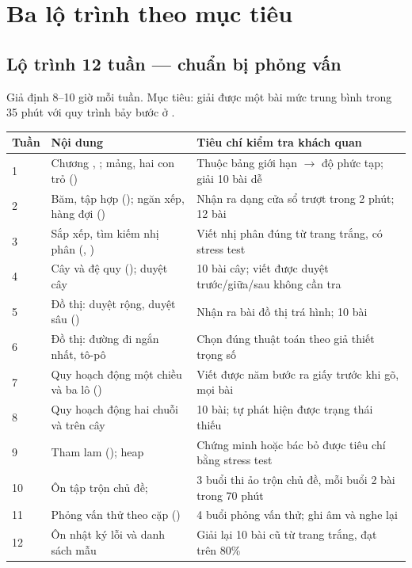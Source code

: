 \documentclass[../../algorithm.tex]{subfiles}
\begin{document}
\section{Ba lộ trình theo mục tiêu}

\subsection{Lộ trình 12 tuần --- chuẩn bị phỏng vấn}

Giả định 8--10 giờ mỗi tuần. Mục tiêu: giải được một bài mức trung bình trong 35 phút với quy trình bảy bước ở .

\begin{center}\footnotesize
\begin{tabularx}{\linewidth}{@{}L{1.9cm}L{4.6cm}Y@{}}
\toprule
\textbf{Tuần} & \textbf{Nội dung} & \textbf{Tiêu chí kiểm tra khách quan}\\
 & Chương , ; mảng, hai con trỏ () & Thuộc bảng giới hạn \(\rightarrow\) độ phức tạp; giải 10 bài dễ\\
2 & Băm, tập hợp (); ngăn xếp, hàng đợi () & Nhận ra dạng cửa sổ trượt trong 2 phút; 12 bài\\
3 & Sắp xếp, tìm kiếm nhị phân (, ) & Viết nhị phân đúng từ trang trắng, có stress test\\
4 & Cây và đệ quy (); duyệt cây & 10 bài cây; viết được duyệt trước/giữa/sau không cần tra\\
5 & Đồ thị: duyệt rộng, duyệt sâu () & Nhận ra bài đồ thị trá hình; 10 bài\\
6 & Đồ thị: đường đi ngắn nhất, tô-pô & Chọn đúng thuật toán theo giả thiết trọng số\\
7 & Quy hoạch động một chiều và ba lô () & Viết được năm bước ra giấy trước khi gõ, mọi bài\\
8 & Quy hoạch động hai chuỗi và trên cây & 10 bài; tự phát hiện được trạng thái thiếu\\
9 & Tham lam (); heap & Chứng minh hoặc bác bỏ được tiêu chí bằng stress test\\
10 & Ôn tập trộn chủ đề;  & 3 buổi thi ảo trộn chủ đề, mỗi buổi 2 bài trong 70 phút\\
11 & Phỏng vấn thử theo cặp () & 4 buổi phỏng vấn thử; ghi âm và nghe lại\\
12 & Ôn nhật ký lỗi và danh sách mẫu & Giải lại 10 bài cũ từ trang trắng, đạt trên 80\%\\
\bottomrule
\end{tabularx}
\end{center}
\end{document}
